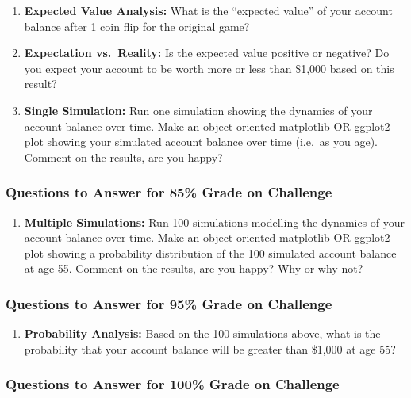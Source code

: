 \documentclass[
  letterpaper,
  DIV=11,
  numbers=noendperiod]{scrartcl}
\providecommand{\tightlist}{%
  \setlength{\itemsep}{0pt}\setlength{\parskip}{0pt}}
\begin{document}
\begin{enumerate}
\def\labelenumi{\arabic{enumi}.}
\item
  \textbf{Expected Value Analysis:} What is the ``expected value'' of
  your account balance after 1 coin flip for the original game?
\item
  \textbf{Expectation vs.~Reality:} Is the expected value positive or
  negative? Do you expect your account to be worth more or less than
  \$1,000 based on this result?
\item
  \textbf{Single Simulation:} Run one simulation showing the dynamics of
  your account balance over time. Make an object-oriented matplotlib OR
  ggplot2 plot showing your simulated account balance over time (i.e.~as
  you age). Comment on the results, are you happy?
\end{enumerate}

\subsubsection{Questions to Answer for 85\% Grade on
Challenge}\label{questions-to-answer-for-85-grade-on-challenge}

\begin{enumerate}
\def\labelenumi{\arabic{enumi}.}
\setcounter{enumi}{3}
\tightlist
\item
  \textbf{Multiple Simulations:} Run 100 simulations modelling the
  dynamics of your account balance over time. Make an object-oriented
  matplotlib OR ggplot2 plot showing a probability distribution of the
  100 simulated account balance at age 55. Comment on the results, are
  you happy? Why or why not?
\end{enumerate}

\subsubsection{Questions to Answer for 95\% Grade on
Challenge}\label{questions-to-answer-for-95-grade-on-challenge}

\begin{enumerate}
\def\labelenumi{\arabic{enumi}.}
\setcounter{enumi}{4}
\tightlist
\item
  \textbf{Probability Analysis:} Based on the 100 simulations above,
  what is the probability that your account balance will be greater than
  \$1,000 at age 55?
\end{enumerate}

\subsubsection{Questions to Answer for 100\% Grade on
Challenge}\label{questions-to-answer-for-100-grade-on-challenge}
\end{document}
